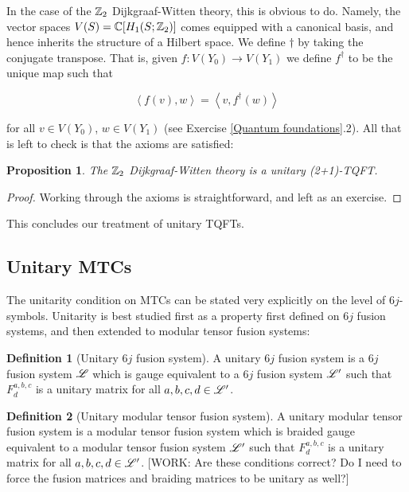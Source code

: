 \documentclass{article}
\newtheorem{proposition}{Proposition}[section]
\theoremstyle{definition}
\newtheorem*{definition}{Definition}
\numberwithin{figure}{section}
\begin{document}
In the case of the $\mathbb{Z}_2$ Dijkgraaf-Witten theory, this is obvious to do. Namely, the vector spaces $V(S)=\mathbb{C}[H_1(S;\mathbb{Z}_2)]$ comes equipped with a canonical basis, and hence inherits the structure of a Hilbert space. We define $\dagger$ by taking the conjugate transpose. That is, given $f: V(Y_0)\to V(Y_1)$ we define $f^{\dagger}$ to be the unique map such that

$$\left<f(v),w\right>=\left<v,f^{\dagger}(w)\right>$$

for all $v\in V(Y_0)$, $w\in V(Y_1)$ (see Exercise \ref{Quantum foundations}.2). All that is left to check is that the axioms are satisfied:

\begin{proposition} The $\mathbb{Z}_2$ Dijkgraaf-Witten theory is a unitary (2+1)-TQFT.
\end{proposition}
\begin{proof} Working through the axioms is straightforward, and left as an exercise.
\end{proof}

This concludes our treatment of unitary TQFTs.

\subsection{Unitary MTCs}

The unitarity condition on MTCs can be stated very explicitly on the level of $6j$-symbols. Unitarity is best studied first as a property first defined on $6j$ fusion systems, and then extended to modular tensor fusion systems:

\begin{definition}[Unitary $6j$ fusion system] A unitary $6j$ fusion system is a $6j$ fusion system $\mathscr{L}$ which is gauge equivalent to a $6j$ fusion system $\mathscr{L}'$ such that $F^{a,b,c}_{d}$ is a unitary matrix for all $a,b,c,d\in \mathscr{L}'$.

\raggedleft\qedsymbol{}
\end{definition}

\begin{definition}[Unitary modular tensor fusion system] A unitary modular tensor fusion system is a modular tensor fusion system which is braided gauge equivalent to a modular tensor fusion system $\mathscr{L}'$ such that $F^{a,b,c}_{d}$ is a unitary matrix for all $a,b,c,d\in\mathscr{L}'$. [WORK: Are these conditions correct? Do I need to force the fusion matrices and braiding matrices to be unitary as well?]

\raggedleft\qedsymbol{}
\end{definition}
\end{document}
